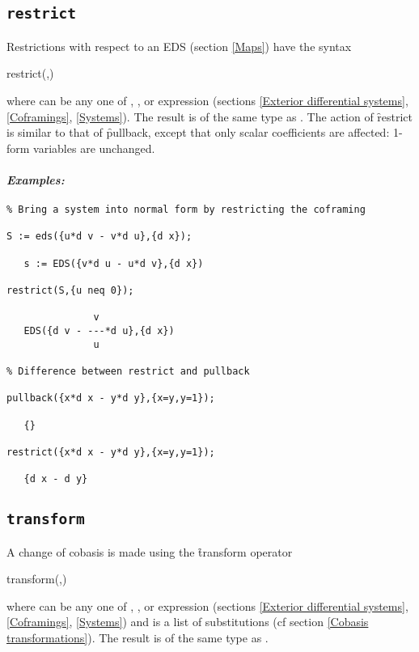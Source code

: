 \subsection{\tt restrict}
\label{restrict}

Restrictions with respect to an EDS  (section \ref{Maps}) have the
syntax
\begin{syntax}
	restrict(,)
\end{syntax}
where  can be any one of , ,
 or  expression (sections \ref{Exterior
differential systems}, \ref{Coframings}, \ref{Systems}). The result is of
the same type as . The action of \f{restrict} is similar to that
of \f{pullback}, except that only scalar coefficients are affected: 1-form
variables are unchanged.

\paragraph{\it Examples:}
\begin{verbatim}
% Bring a system into normal form by restricting the coframing

S := eds({u*d v - v*d u},{d x});

   s := EDS({v*d u - u*d v},{d x}) 

restrict(S,{u neq 0});

               v
   EDS({d v - ---*d u},{d x})
               u 

% Difference between restrict and pullback

pullback({x*d x - y*d y},{x=y,y=1});

   {}

restrict({x*d x - y*d y},{x=y,y=1});

   {d x - d y}
\end{verbatim}

\subsection{\tt transform}
\label{transform}

A change of cobasis is made using the \f{transform} operator
\begin{syntax}
	transform(,)
\end{syntax}
where  can be any one of , ,
 or  expression (sections \ref{Exterior
differential systems}, \ref{Coframings}, \ref{Systems}) and 
is a list of substitutions (cf section \ref{Cobasis transformations}). The
result is of the same type as .

